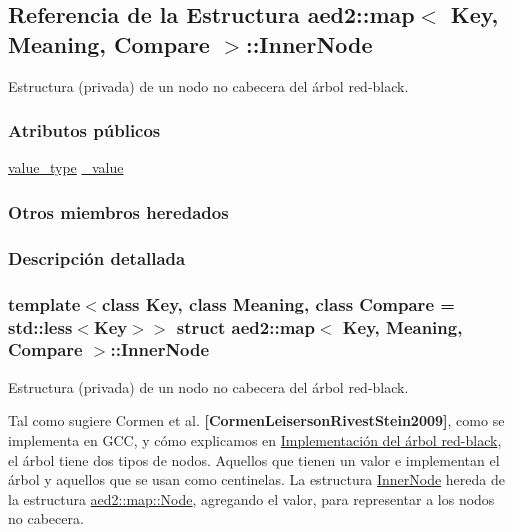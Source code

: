 \hypertarget{structaed2_1_1map_1_1InnerNode}{}\subsection{Referencia de la Estructura aed2\+:\+:map$<$ Key, Meaning, Compare $>$\+:\+:Inner\+Node}
\label{structaed2_1_1map_1_1InnerNode}


Estructura (privada) de un nodo no cabecera del árbol red-\/black.  


\subsubsection*{Atributos públicos}
\begin{DoxyCompactItemize}
\item 
\hyperlink{classaed2_1_1map_a719db98e0ff9a837610f76be33264680_a719db98e0ff9a837610f76be33264680}{value\+\_\+type} \hyperlink{structaed2_1_1map_1_1InnerNode_a53fd8a50986fec67601dd77c44c1657e_a53fd8a50986fec67601dd77c44c1657e}{\+\_\+value}
\end{DoxyCompactItemize}
\subsubsection*{Otros miembros heredados}


\subsubsection{Descripción detallada}
\subsubsection*{template$<$class Key, class Meaning, class Compare = std\+::less$<$\+Key$>$$>$\newline
struct aed2\+::map$<$ Key, Meaning, Compare $>$\+::\+Inner\+Node}

Estructura (privada) de un nodo no cabecera del árbol red-\/black. 

Tal como sugiere Cormen et al. {\bfseries [Cormen\+Leiserson\+Rivest\+Stein2009]}, como se implementa en G\+CC, y cómo explicamos en \hyperlink{Implementacion}{Implementación del árbol red-\/black}, el árbol tiene dos tipos de nodos. Aquellos que tienen un valor e implementan el árbol y aquellos que se usan como centinelas. La estructura \hyperlink{structaed2_1_1map_1_1InnerNode}{Inner\+Node} hereda de la estructura \hyperlink{structaed2_1_1map_1_1Node}{aed2\+::map\+::\+Node}, agregando el valor, para representar a los nodos no cabecera.

